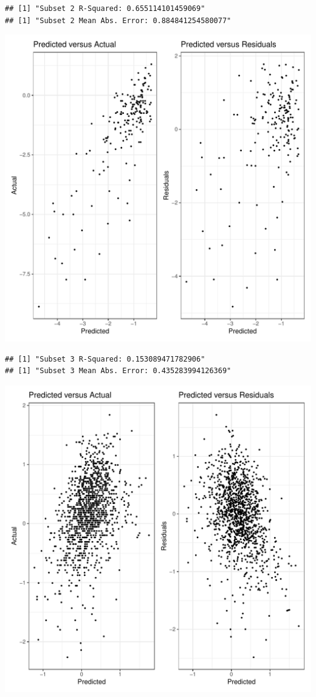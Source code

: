 \documentclass{article}\usepackage[]{graphicx}\usepackage[]{xcolor}
\makeatletter
\def\maxwidth{ %
  \ifdim\Gin@nat@width>\linewidth
    \linewidth
  \else
    \Gin@nat@width
  \fi
}
\newenvironment{kframe}{%
 \def\at@end@of@kframe{}%
 \ifinner\ifhmode%
  \def\at@end@of@kframe{\end{minipage}}%
  \begin{minipage}{\columnwidth}%
 \fi\fi%
 \def\FrameCommand##1{\hskip\@totalleftmargin \hskip-\fboxsep
 \colorbox{shadecolor}{##1}\hskip-\fboxsep
     \hskip-\linewidth \hskip-\@totalleftmargin \hskip\columnwidth}%
 \MakeFramed {\advance\hsize-\width
   \@totalleftmargin\z@ \linewidth\hsize
   \@setminipage}}%
 {\par\unskip\endMakeFramed%
 \at@end@of@kframe}
\newenvironment{knitrout}{}{} %
\makeatother
\begin{document}
\begin{knitrout}
\begin{kframe}\begin{verbatim}
## [1] "Subset 2 R-Squared: 0.655114101459069"
## [1] "Subset 2 Mean Abs. Error: 0.884841254580077"
\end{verbatim}
\end{kframe}
\includegraphics[width=\maxwidth]{figure/unnamed-chunk-13-6} 
\begin{kframe}\begin{verbatim}
## [1] "Subset 3 R-Squared: 0.153089471782906"
## [1] "Subset 3 Mean Abs. Error: 0.435283994126369"
\end{verbatim}
\end{kframe}
\includegraphics[width=\maxwidth]{figure/unnamed-chunk-13-7} 
\end{knitrout}
\end{document}
